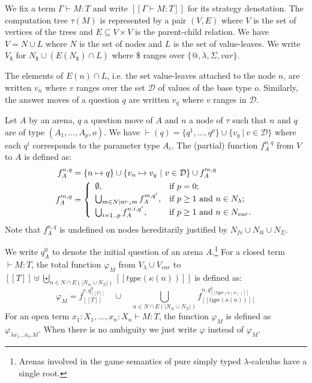 \documentclass{llncs}
\newcommand\inter{\cap}
\newcommand\union{\cup}
\newcommand\Union{\bigcup}
\newcommand{\relimg}[1]{{(\!| #1 |\!)}}
\newcommand{\sem}[1]{{[\![ #1 ]\!]}}
\begin{document}
We fix a term $\Gamma \vdash M : T$ and write $\sem{\Gamma \vdash M : T}$ for its strategy denotation.
The computation tree $\tau(M)$ is represented by a pair $(V,E)$ where $V$ is the set of vertices of
the trees and $E \subseteq V \times V$ is the parent-child relation. We have $V = N \union L$ where $N$ is the set of nodes and $L$ is the set of value-leaves.
We write $V_\$$  for $N_\$ \union (E(N_\$) \inter L) $ where $\$$ ranges over $\{@, \lambda, \Sigma, var \}$.

The elements of $E(n) \inter L$, i.e. the set value-leaves attached to the node $n$, are
written $v_n$ where $ v$ ranges over the set $\mathcal{D}$ of values of the base type $o$.
Similarly, the answer moves of a question $q$ are written $v_q$ where $v$ ranges in $\mathcal{D}$.

\begin{definition}
\label{def:phi_procedure}
Let $A$ by an arena, $q$ a question move of $A$ and $n$ a node of $\tau$ such that $n$ and $q$ are of type
$(A_1,\ldots,A_p,o)$.
We have $\vdash( q ) = \{ q^1, \ldots, q^p \} \union \{  v_q \ | \ v \in \mathcal{D} \}$ where each $q^i$ corresponds to
the parameter type $A_i$. The (partial) function $f_A^{n,q}$ from $V$ to $A$ is defined as:
\begin{eqnarray*}
f_A^{n,q} &= \{ n \mapsto q \} \union  \{ v_n \mapsto v_q \ | \ v \in \mathcal{D} \} \union f'^{n,q}_{A} \\
f'^{n,q}_A &= \left\{
                \begin{array}{ll}
                  \emptyset, & \hbox{if $p=0$;} \\
                  \Union_{m \in N | n \vdash_i m} f_A^{m, q^i}, & \hbox{if $p\geq1$ and $n\in N_{\lambda}$;} \\
                  \Union_{i=1..p} f_A^{n.i, q^i}, & \hbox{if $p\geq1$ and $n\in N_{var}$.}
                \end{array}
              \right.
\end{eqnarray*}
Note that $f_A^{n,q}$ is undefined on nodes hereditarily justified by $N_{fv} \union N_@ \union N_\Sigma$.
\end{definition}


\begin{definition}
We write $q^0_A$ to denote the initial question of an arena $A$.\footnote{Arenas involved in the game semantics of pure simply typed $\lambda$-calculus have a single root.}
For a closed term $\vdash M : T$, the total function $\varphi_M$ from $V_\lambda \union V_{var}$ to $\sem{T} \uplus \biguplus_{n \in N \inter E \relimg{N_@ \union N_\Sigma} } \sem{type(\kappa(n))}$ is defined as:
$$
\varphi_M = f_{\sem{T}}^{r, q^0_{\sem{T}}}
\quad \union \quad
        \Union_{n \in N \inter E \relimg{N_@ \union N_\Sigma}}  f_{\sem{type(\kappa(n))}}^{n, q^0_{\sem{type(\kappa(n))}}}
$$
For an open term $x_1 : X_1, \ldots, x_n : X_n \vdash M : T$, the function $\varphi_M$ is defined as
$\varphi_{\lambda x_1 \ldots x_n . M}$. When there is no ambiguity we just write $\varphi$ instead of $\varphi_M$.
\end{definition}
\end{document}
